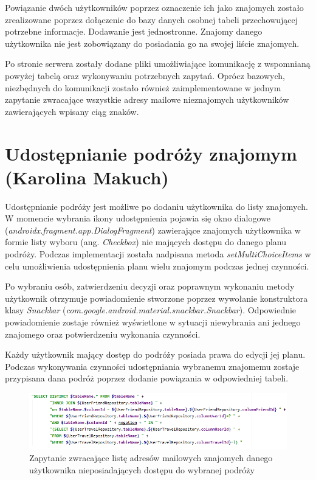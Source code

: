 \documentclass[10pt,twoside,a4paper]{report}
\begin{document}
\par Powiązanie dwóch użytkowników poprzez oznaczenie ich jako znajomych zostało zrealizowane poprzez dołączenie do bazy danych osobnej tabeli przechowującej potrzebne informacje. Dodawanie jest jednostronne. Znajomy danego użytkownika nie jest zobowiązany do posiadania go na swojej liście znajomych.
\par Po stronie serwera zostały dodane pliki umożliwiające komunikację z wspomnianą powyżej tabelą oraz wykonywaniu potrzebnych zapytań. Oprócz bazowych, niezbędnych do komunikacji zostało również zaimplementowane w jednym zapytanie zwracające wszystkie adresy mailowe nieznajomych użytkowników zawierających wpisany ciąg znaków.

\section{Udostępnianie podróży znajomym (Karolina Makuch)}

\par  Udostępnianie podróży jest możliwe po dodaniu użytkownika do listy znajomych. W momencie wybrania ikony udostępnienia pojawia się okno dialogowe (\textit{androidx.fragment.app.DialogFragment}) zawierające znajomych użytkownika w formie  listy wyboru (ang. \textit{Checkbox}) nie mających dostępu do danego planu podróży. Podczas implementacji została nadpisana metoda \textit{setMultiChoiceItems} w celu umożliwienia udostępnienia planu wielu znajomym podczas jednej czynności.
\par  Po wybraniu osób, zatwierdzeniu decyzji oraz poprawnym wykonaniu metody użytkownik otrzymuje powiadomienie stworzone poprzez wywołanie konstruktora klasy \textit{Snackbar}  
(\textit{com.google.android.material.snackbar.Snackbar}).  Odpowiednie powiadomienie zostaje również wyświetlone w sytuacji niewybrania ani jednego znajomego oraz potwierdzeniu wykonania czynności.
\par  Każdy użytkownik mający dostęp do podróży posiada prawa do edycji jej planu. Podczas wykonywania czynności udostępniania wybranemu znajomemu zostaje przypisana dana podróż poprzez dodanie powiązania w odpowiedniej tabeli.

\begin{figure}[h]
\centering
\includegraphics[width=\linewidth]{getFriendsBySharedTravel}
\caption{Zapytanie zwracające listę adresów mailowych znajomych danego użytkownika nieposiadających dostępu do wybranej podróży}
\label{fig:getFriendsBySharedTravel}
\end{figure} 
\end{document}
